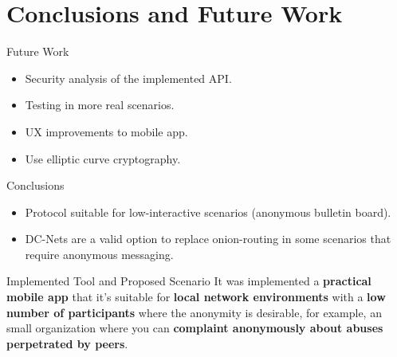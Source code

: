 \section{Conclusions and Future Work}

\begin{frame}{Future Work}
    \begin{itemize}
        \item Security analysis of the implemented API.
        \item Testing in more real scenarios.
        \item UX improvements to mobile app.
        \item Use elliptic curve cryptography.
    \end{itemize}
\end{frame}

\begin{frame}{Conclusions}
    \begin{itemize}
        \item Protocol suitable for low-interactive scenarios (anonymous bulletin board).
        \item DC-Nets are a valid option to replace onion-routing in some scenarios that require anonymous messaging.
    \end{itemize}
\end{frame}

\begin{frame}{Implemented Tool and Proposed Scenario}
\justify
It was implemented a \textbf{practical mobile app} that it's suitable for \textbf{local network environments} with a \textbf{low number of participants} where the anonymity is desirable, for example, an small organization where you can \textbf{complaint anonymously about abuses perpetrated by peers}.
\end{frame}
